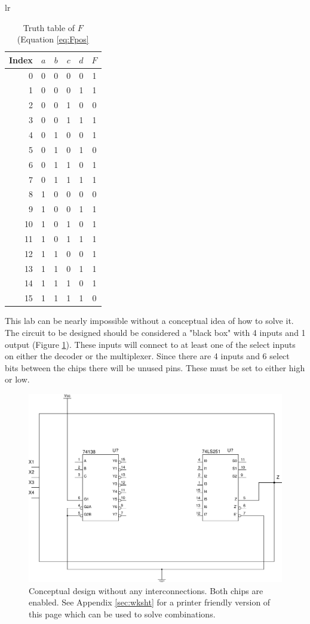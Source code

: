\documentclass[12pt]{article}
\begin{document}
\begin{table}[tbp]
\begin{center}
\begin{tabular}{lr}
\begin{tabular}[t]{r|cccc|c}
Index&$a$&$b$&$c$&$d$&$F$\\
\hline
0 &0&0&0&0 &1\\
1 &0&0&0&1 &1\\
2 &0&0&1&0 &0\\
3 &0&0&1&1 &1\\
4 &0&1&0&0 &1\\
5 &0&1&0&1 &0\\
6 &0&1&1&0 &1\\
7 &0&1&1&1 &1\\
8 &1&0&0&0 &0\\
9 &1&0&0&1 &1\\
10 &1&0&1&0 &1\\
11 &1&0&1&1 &1\\
12 &1&1&0&0 &1\\
13 &1&1&0&1 &1\\
14 &1&1&1&0 &1\\
15 &1&1&1&1 &0\\
\end{tabular}
\end{tabular}
\end{center}
\caption{Truth table of $F$ (Equation \ref{eq:Fpos}}
\label{tbl:tt}
\end{table}

This lab can be nearly impossible without a conceptual
idea of how to solve it.
The circuit to be designed should be considered a
"black box" with 4 inputs and 1 output (Figure \ref{fig:concept}).
These inputs will connect to at least one of the select
inputs on either the decoder or the multiplexer.
Since there are 4 inputs and 6 select bits between the
chips there will be unused pins.
These must be set to either high or low.

\begin{figure}[htbp]
\center
\includegraphics[scale=0.5]{lab8-circuit-01}
\caption{Conceptual design without any interconnections.  Both chips are enabled.
See Appendix \ref{sec:wksht} for a printer friendly version of this page
which can be used to solve combinations.}
\label{fig:concept}
\end{figure}
\end{document}
